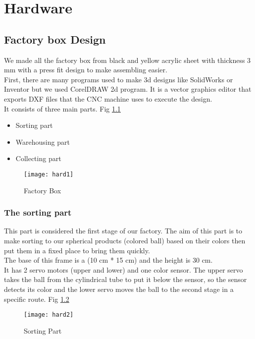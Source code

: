 \chapter{Hardware}

\section{Factory box Design}
We made all the factory box from black and yellow acrylic sheet with thickness 3 mm with a press fit
design to make assembling easier.\\
First, there are many programs used to make 3d designs like SolidWorks or Inventor but we used
CorelDRAW 2d program. It is a vector graphics editor that exports DXF files that the CNC machine
uses to execute the design.\\
It consists of three main parts. Fig \ref{fig:hard1}
\begin{itemize}
    \item Sorting part
    \item Warehousing part
    \item Collecting part
\end{itemize}

\begin{figure}[h]
    \texttt{[image: hard1]}
    \centering
    \caption{Factory Box}
    \label{fig:hard1}
\end{figure}

\subsection{The sorting part}
This part is considered the first stage of our factory. The aim of this part is to make sorting to our
spherical products (colored ball) based on their colors then put them in a fixed place to bring them
quickly.\\
The base of this frame is a (10 cm * 15 cm) and the height is 30 cm.\\
It has 2 servo motors (upper and lower) and one color sensor. The upper servo takes the ball from the
cylindrical tube to put it below the sensor, so the sensor detects its color and the lower servo moves
the ball to the second stage in a specific route. Fig \ref{fig:hard2}

\begin{figure}[h]
    \texttt{[image: hard2]}
    \centering
    \caption{Sorting Part}
    \label{fig:hard2}
\end{figure}


